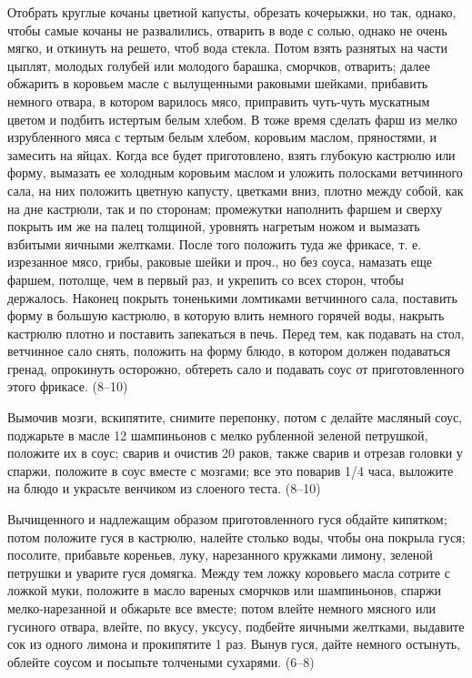 
Отобрать круглые кочаны цветной капусты, обрезать кочерыжки, но так, однако, чтобы самые кочаны не развалились, отварить в воде с солью, однако не очень мягко, и откинуть на решето, чтоб вода стекла. Потом взять разнятых на части цыплят, молодых голубей или молодого барашка, сморчков, отварить; далее обжарить в коровьем масле с вылущенными раковыми шейками, прибавить немного отвара, в котором варилось мясо, приправить чуть-чуть мускатным цветом и подбить истертым белым хлебом. В тоже время сделать фарш из мелко изрубленного мяса с тертым белым хлебом, коровьим маслом, пряностями, и замесить на яйцах. Когда все будет приготовлено, взять глубокую кастрюлю или форму, вымазать ее холодным коровьим маслом и уложить полосками ветчинного сала, на них положить цветную капусту, цветками вниз, плотно между собой, как на дне кастрюли, так и по сторонам; промежутки наполнить фаршем и сверху покрыть им же на палец толщиной, уровнять нагретым ножом и вымазать взбитыми яичными желтками. После того положить туда же фрикасе, т. е. изрезанное мясо, грибы, раковые шейки и проч., но без соуса, намазать еще фаршем, потолще, чем в первый раз, и укрепить со всех сторон, чтобы держалось. Наконец покрыть тоненькими ломтиками ветчинного сала, поставить форму в большую кастрюлю, в которую влить немного горячей воды, накрыть кастрюлю плотно и поставить запекаться в печь. Перед тем, как подавать на стол, ветчинное сало снять, положить на форму блюдо, в котором должен подаваться гренад, опрокинуть осторожно, обтереть сало и подавать соус от приготовленного этого фрикасе. (8--10) 


Вымочив мозги, вскипятите, снимите перепонку, потом с делайте масляный соус, поджарьте в масле 12 шампиньонов с мелко рубленной зеленой петрушкой, положите их в соус; сварив и очистив 20 раков, также сварив и отрезав головки у спаржи, положите в соус вместе с мозгами; все это поварив 1/4 часа, выложите на блюдо и украсьте венчиком из слоеного теста. (8--10) 


Вычищенного и надлежащим образом приготовленного гуся обдайте кипятком; потом положите гуся в кастрюлю, налейте столько воды, чтобы она покрыла гуся; посолите, прибавьте кореньев, луку, нарезанного кружками лимону, зеленой петрушки и уварите гуся домягка. Между тем ложку коровьего масла сотрите с ложкой муки, положите в масло вареных сморчков или шампиньонов, спаржи мелко-нарезанной и обжарьте все вместе; потом влейте немного мясного или гусиного отвара, влейте, по вкусу, уксусу, подбейте яичными желтками, выдавите сок из одного лимона и прокипятите 1 раз. Вынув гуся, дайте немного остынуть, облейте соусом и посыпьте толчеными сухарями. (6--8) 

